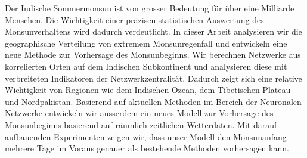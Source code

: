 \begin{zusammenfassung}
Der Indische Sommermonsun ist von grosser Bedeutung für über eine Milliarde Menschen. Die Wichtigkeit einer präzisen statistischen Auswertung des Monsunverhaltens wird dadurch verdeutlicht. In dieser Arbeit analysieren wir die geographische Verteilung von extremem Monsunregenfall und entwickeln eine neue Methode zur Vorhersage des Monsunbeginns. Wir berechnen Netzwerke aus korrelierten Orten auf dem Indischen Subkontinent und analysieren diese mit verbreiteten Indikatoren der Netzwerkzentralität. Dadurch zeigt sich eine relative Wichtigkeit von Regionen wie dem Indischen Ozean, dem Tibetischen Plateau und Nordpakistan. Basierend auf aktuellen Methoden im Bereich der Neuronalen Netzwerke entwickeln wir ausserdem ein neues Modell zur Vorhersage des Monsunbeginns basierend auf räumlich-zeitlichen Wetterdaten. Mit darauf aufbauenden Experimenten zeigen wir, dass unser Modell den Monsunanfang mehrere Tage im Voraus genauer als bestehende Methoden vorhersagen kann.
\end{zusammenfassung}
